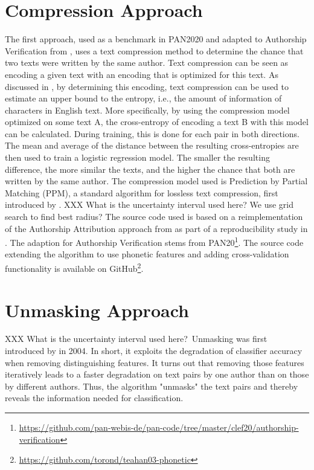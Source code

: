 \section{Compression Approach}\label{sec:compression-approach}
The first approach, used as a benchmark in PAN2020 and adapted to Authorship Verification from \cite{teahan2003compression}, uses a text compression method to determine the chance that two texts were written by the same author.
Text compression can be seen as encoding a given text with an encoding that is optimized for this text.
As discussed in \cite{brown1992upperBoundEntropy}, by determining this encoding, text compression can be used to estimate an upper bound to the entropy, i.e., the amount of information of characters in English text.
More specifically, by using the compression model optimized on some text A, the cross-entropy of encoding a text B with this model can be calculated.
During training, this is done for each pair in both directions.
The mean and average of the distance between the resulting cross-entropies are then used to train a logistic regression model.
The smaller the resulting difference, the more similar the texts, and the higher the chance that both are written by the same author.
The compression model used is Prediction by Partial Matching (PPM), a standard algorithm for lossless text compression, first introduced by \cite{cleary1984PPM}.
XXX What is the uncertainty interval used here? We use grid search to find best radius?
The source code used is based on a reimplementation of the Authorship Attribution approach from \cite{teahan2003compression} as part of a reproducibility study in \cite{potthast2016reimplementation}.
The adaption for Authorship Verification stems from PAN20\footnote{\url{https://github.com/pan-webis-de/pan-code/tree/master/clef20/authorship-verification}}.
The source code extending the algorithm to use phonetic features and adding cross-validation functionality is available on GitHub\footnote{\url{https://github.com/torond/teahan03-phonetic}}.

\section{Unmasking Approach}\label{sec:unmasking-approach}
XXX What is the uncertainty interval used here?\
Unmasking was first introduced by \citeauthor{koppel2004unmasking} in 2004.
In short, it exploits the degradation of classifier accuracy when removing distinguishing features.
It turns out that removing those features iteratively leads to a faster degradation on text pairs by one author than on those by different authors.
Thus, the algorithm "unmasks" the text pairs and thereby reveals the information needed for classification.\\

